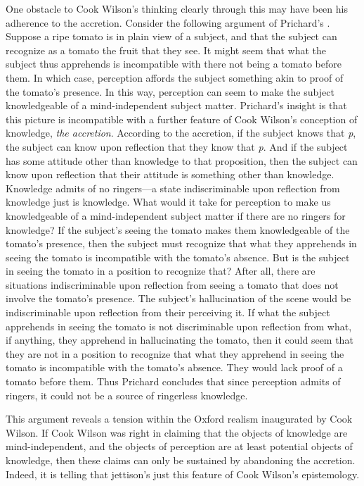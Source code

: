\documentclass[12pt]{article}
\begin{document}
One obstacle to Cook Wilson's thinking clearly through this may have been his adherence to the accretion. Consider the following argument of Prichard's \citeyearpar[11]{Prichard:1938ve}. Suppose a ripe tomato is in plain view of a subject, and that the subject can recognize as a tomato the fruit that they see. It might seem that what the subject thus apprehends is incompatible with there not being a tomato before them. In which case, perception affords the subject something akin to proof of the tomato's presence. In this way, perception can seem to make the subject knowledgeable of a mind-independent subject matter. Prichard's insight is that this picture is incompatible with a further feature of Cook Wilson's conception of knowledge, \emph{the accretion}. According to the accretion, if the subject knows that \emph{p}, the subject can know upon reflection that they know that \emph{p}. And if the subject has some attitude other than knowledge to that proposition, then the subject can know upon reflection that their attitude is something other than knowledge. Knowledge admits of no ringers---a state indiscriminable upon reflection from knowledge just is knowledge. What would it take for perception to make us knowledgeable of a mind-independent subject matter if there are no ringers for knowledge? If the subject's seeing the tomato makes them knowledgeable of the tomato's presence, then the subject must recognize that what they apprehends in seeing the tomato is incompatible with the tomato's absence. But is the subject in seeing the tomato in a position to recognize that? After all, there are situations indiscriminable upon reflection from seeing a tomato that does not involve the tomato's presence. The subject's hallucination of the scene would be indiscriminable upon reflection from their perceiving it. If what the subject apprehends in seeing the tomato is not discriminable upon reflection from what, if anything, they apprehend in hallucinating the tomato, then it could seem that they are not in a position to recognize that what they apprehend in seeing the tomato is incompatible with the tomato's absence. They would lack proof of a tomato before them. Thus Prichard concludes that since perception admits of ringers, it could not be a source of ringerless knowledge.

This argument reveals a tension within the Oxford realism inaugurated by Cook Wilson. If Cook Wilson was right in claiming that the objects of knowledge are mind-independent, and the objects of perception are at least potential objects of knowledge, then these claims can only be sustained by abandoning the accretion. Indeed, it is telling that \citet{Austin:1962lr} jettison's just this feature of Cook Wilson's epistemology. 
\end{document}
